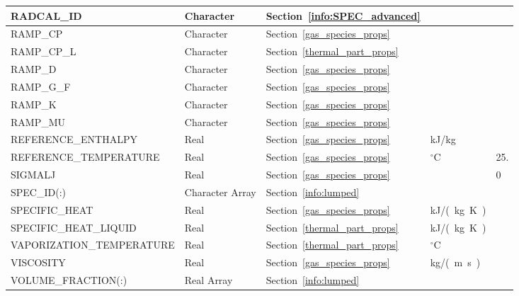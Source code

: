 \documentclass[11pt]{book}
\begin{document}
\begin{longtable}{@{\extracolsep{\fill}}|l|l|l|l|l|}
{\ct RADCAL\_ID}                    & Character   & Section~\ref{info:SPEC_advanced}        &                   &               \\ \hline
{\ct RAMP\_CP}                      & Character   & Section~\ref{gas_species_props}         &                   &               \\ \hline
{\ct RAMP\_CP\_L}                   & Character   & Section~\ref{thermal_part_props}        &                   &               \\ \hline
{\ct RAMP\_D}                       & Character   & Section~\ref{gas_species_props}         &                   &               \\ \hline
{\ct RAMP\_G\_F}                    & Character   & Section~\ref{gas_species_props}         &                   &               \\ \hline
{\ct RAMP\_K}                       & Character   & Section~\ref{gas_species_props}         &                   &               \\ \hline
{\ct RAMP\_MU}                      & Character   & Section~\ref{gas_species_props}         &                   &               \\ \hline
{\ct REFERENCE\_ENTHALPY}           & Real        & Section~\ref{gas_species_props}         & kJ/kg             &               \\ \hline
{\ct REFERENCE\_TEMPERATURE}        & Real        & Section~\ref{gas_species_props}         & $^\circ$C         & 25.           \\ \hline
{\ct SIGMALJ}                       & Real        & Section~\ref{gas_species_props}         &                   & 0             \\ \hline
{\ct SPEC\_ID(:)}                   & Character Array   & Section~\ref{info:lumped}             &                   &               \\ \hline
{\ct SPECIFIC\_HEAT}                & Real        & Section~\ref{gas_species_props}         & \si{kJ/(kg.K)}    &               \\ \hline
{\ct SPECIFIC\_HEAT\_LIQUID}        & Real        & Section~\ref{thermal_part_props}        & \si{kJ/(kg.K)}    &               \\ \hline
{\ct VAPORIZATION\_TEMPERATURE}     & Real        & Section~\ref{thermal_part_props}        & $^\circ$C         &               \\ \hline
{\ct VISCOSITY}                     & Real        & Section~\ref{gas_species_props}         & \si{kg/(m.s)}     &               \\ \hline
{\ct VOLUME\_FRACTION(:)}           & Real Array        & Section~\ref{info:lumped}             &                   &               \\ \hline
\end{longtable}
\end{document}
